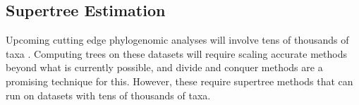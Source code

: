 \subsection{Supertree Estimation}


Upcoming cutting edge phylogenomic analyses will involve tens of thousands of taxa \cite{koepfli2015genome, zhang2015genomics}. Computing trees on these datasets will require scaling accurate methods beyond what is currently possible, and divide and conquer methods are a promising technique for this. However, these require supertree methods that can run on datasets with tens of thousands of taxa. 


